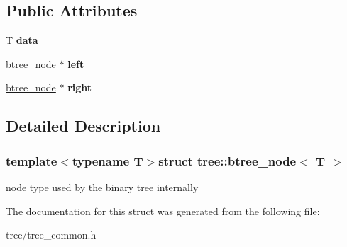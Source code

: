 \subsection*{Public Attributes}
\begin{DoxyCompactItemize}
\item 
\hypertarget{structtree_1_1btree__node_a1f44c7c53c16a4f8827b0f4b468d4531}{T {\bfseries data}}\label{structtree_1_1btree__node_a1f44c7c53c16a4f8827b0f4b468d4531}

\item 
\hypertarget{structtree_1_1btree__node_aed5a80dfa830209910c13f7a55b91b83}{\hyperlink{structtree_1_1btree__node}{btree\-\_\-node} $\ast$ {\bfseries left}}\label{structtree_1_1btree__node_aed5a80dfa830209910c13f7a55b91b83}

\item 
\hypertarget{structtree_1_1btree__node_a82e9a7410832850bc4c05a5eb63fab21}{\hyperlink{structtree_1_1btree__node}{btree\-\_\-node} $\ast$ {\bfseries right}}\label{structtree_1_1btree__node_a82e9a7410832850bc4c05a5eb63fab21}

\end{DoxyCompactItemize}


\subsection{Detailed Description}
\subsubsection*{template$<$typename T$>$struct tree\-::btree\-\_\-node$<$ T $>$}

node type used by the binary tree internally 

The documentation for this struct was generated from the following file\-:\begin{DoxyCompactItemize}
\item 
tree/tree\-\_\-common.\-h\end{DoxyCompactItemize}
